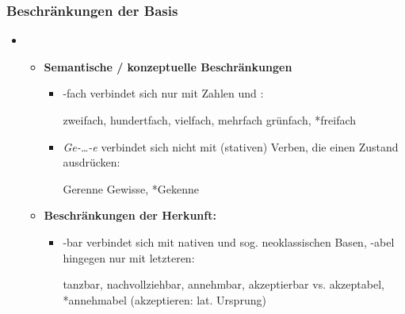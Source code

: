 \begin{frame}
\frametitle{Beschränkungen der Basis}

\begin{itemize}
	\item[]
	
	\begin{itemize}
		\item \textbf{Semantische / konzeptuelle Beschränkungen}
	
		\begin{itemize}
			\item -fach verbindet sich nur mit Zahlen und :
		
			\ea zweifach, hundertfach, vielfach, mehrfach \vs *grünfach, *freifach
			\z
		
			\item \textit{Ge-{\dots}-e} verbindet sich nicht mit (stativen) Verben, die einen Zustand ausdrücken:
		
			\ea Gerenne \vs *Gewisse, *Gekenne
			\z
			
		\end{itemize}
		
	\item \textbf{Beschränkungen der Herkunft:}
	
	\begin{itemize}
		\item -bar verbindet sich mit nativen und sog. neoklassischen Basen, -abel hingegen nur mit letzteren: 
		
		\ea tanzbar, nachvollziehbar, annehmbar, akzeptierbar vs. akzeptabel, *annehmabel (akzeptieren: lat. Ursprung)
		\z
		
		\end{itemize}
		
	\end{itemize}
	
\end{itemize}


\end{frame}




